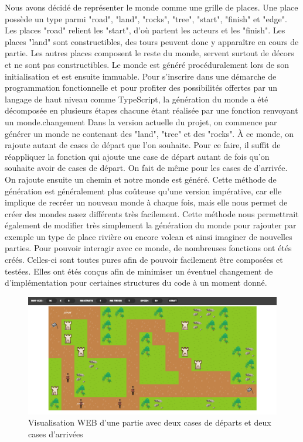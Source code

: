 \documentclass[french]{article}
\begin{document}
Nous avons décidé de représenter le monde comme une grille de places. Une place possède un type parmi "road", "land", "rocks", "tree", "start", "finish" et "edge".
Les places "road" relient les "start", d'où partent les acteurs et les "finish".
Les places "land" sont constructibles, des tours peuvent  donc y apparaître en cours de partie.
Les autres places composent le reste du monde, servent surtout de décors et ne sont pas constructibles.
Le monde est généré procéduralement lors de son initialisation et est ensuite immuable.
Pour s'inscrire dans une démarche de programmation fonctionnelle et pour profiter des possibilités offertes par un langage de haut niveau comme TypeScript, la génération du monde a été décomposée en plusieurs étapes chacune étant réalisée par une fonction renvoyant un monde.changement
Dans la version actuelle du projet, on commence par générer un monde ne contenant des "land", "tree" et des "rocks".
À ce monde, on rajoute autant de cases de départ que l'on souhaite. Pour ce faire, il suffit de réappliquer la fonction qui ajoute une case de départ autant de fois qu'on souhaite avoir de cases de départ. On fait de même pour les cases de d'arrivée. On rajoute ensuite un chemin et notre monde est généré.
Cette méthode de génération est généralement plus coûteuse qu'une version impérative, car elle implique de recréer un nouveau monde à chaque fois, mais elle nous permet de créer des mondes assez différents très facilement.
Cette méthode nous permettrait également de modifier très simplement la génération du monde pour rajouter par exemple un type de place rivière ou encore volcan et ainsi imaginer de nouvelles parties.
Pour pouvoir interagir avec ce monde, de nombreuses fonctions ont étés créés.
Celles-ci sont toutes pures afin de pouvoir facilement être composées et testées. Elles ont étés conçus afin de minimiser un éventuel changement de d'implémentation pour certaines structures du code à un moment donné.

\begin{figure}[H]
    \centering
    \includegraphics[width=\textwidth]{plusieurs_starts_ends.png}
    \caption{Visualisation WEB d’une partie avec deux cases de départs et deux cases d'arrivées}
    \label{fig:graph1}
\end{figure}
\end{document}
